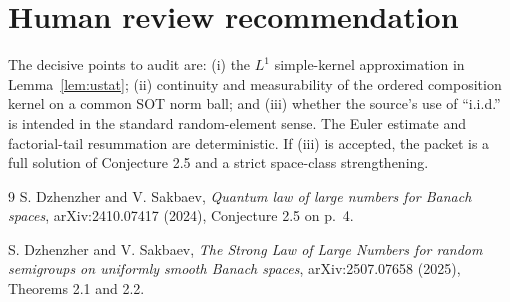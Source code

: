 \documentclass[11pt]{article}
\begin{document}
\section{Human review recommendation}

The decisive points to audit are: (i) the $L^1$ simple-kernel approximation
in Lemma~\ref{lem:ustat}; (ii) continuity and measurability of the ordered
composition kernel on a common SOT norm ball; and (iii) whether the source's
use of ``i.i.d.'' is intended in the standard random-element sense.  The
Euler estimate and factorial-tail resummation are deterministic.  If (iii)
is accepted, the packet is a full solution of Conjecture 2.5 and a strict
space-class strengthening.

\begin{thebibliography}{9}
S. Dzhenzher and V. Sakbaev,
\emph{Quantum law of large numbers for Banach spaces},
arXiv:2410.07417 (2024), Conjecture 2.5 on p.~4.

S. Dzhenzher and V. Sakbaev,
\emph{The Strong Law of Large Numbers for random semigroups on uniformly
smooth Banach spaces}, arXiv:2507.07658 (2025), Theorems 2.1 and 2.2.
\end{thebibliography}
\end{document}
